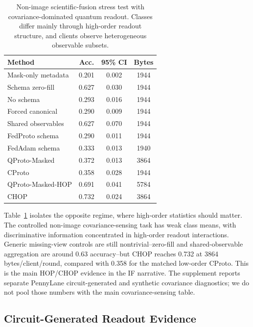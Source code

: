 \documentclass[preprint]{elsarticle}
\begin{document}
\begin{table}[t]
\centering
\caption{Non-image scientific-fusion stress test with covariance-dominated quantum readout. Classes differ mainly through high-order readout structure, and clients observe heterogeneous observable subsets.}
\label{tab:if-scientific-fusion}
\begin{tabular}{lccc}
\toprule
Method & Acc. & 95\% CI & Bytes \\
\midrule
Mask-only metadata & 0.201 & 0.002 & 1944 \\
Schema zero-fill & 0.627 & 0.030 & 1944 \\
No schema & 0.293 & 0.016 & 1944 \\
Forced canonical & 0.290 & 0.009 & 1944 \\
Shared observables & 0.627 & 0.070 & 1944 \\
FedProto schema & 0.290 & 0.011 & 1944 \\
FedAdam schema & 0.333 & 0.013 & 1940 \\
QProto-Masked & 0.372 & 0.013 & 3864 \\
CProto & 0.358 & 0.028 & 1944 \\
QProto-Masked-HOP & 0.691 & 0.041 & 5784 \\
CHOP & 0.732 & 0.024 & 3864 \\
\bottomrule
\end{tabular}
\end{table}


Table~\ref{tab:if-scientific-fusion} isolates the opposite regime, where high-order statistics should matter. The controlled non-image covariance-sensing task has weak class means, with discriminative information concentrated in high-order readout interactions. Generic missing-view controls are still nontrivial--zero-fill and shared-observable aggregation are around 0.63 accuracy--but CHOP reaches 0.732 at 3864 bytes/client/round, compared with 0.358 for the matched low-order CProto. This is the main HOP/CHOP evidence in the IF narrative. The supplement reports separate PennyLane circuit-generated and synthetic covariance diagnostics; we do not pool those numbers with the main covariance-sensing table.

\subsection{Circuit-Generated Readout Evidence}
\end{document}
